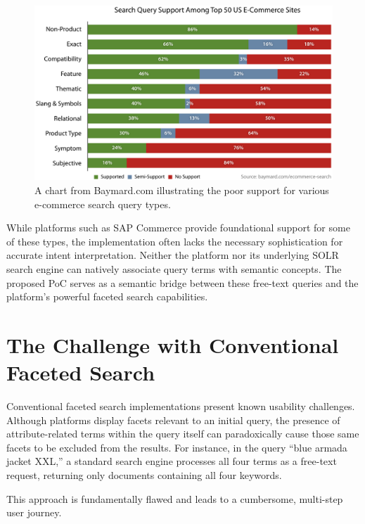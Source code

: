 \documentclass{article}
\begin{document}
    \begin{figure}[H]
        \centering
        \includegraphics[width=\columnwidth]{ecommerce-search-01-query-support-e26a0c0f33559b8702edfe2f626a3dba-1.png}
        \caption{A chart from Baymard.com illustrating the poor support for various e-commerce search query types.}
        \label{fig:baymard_chart}
    \end{figure}

    While platforms such as SAP Commerce provide foundational support for some of these types, the implementation often lacks the necessary sophistication for accurate intent interpretation. Neither the platform nor its underlying SOLR search engine can natively associate query terms with semantic concepts. The proposed PoC serves as a semantic bridge between these free-text queries and the platform's powerful faceted search capabilities.

    \section{The Challenge with Conventional Faceted Search}

    Conventional faceted search implementations present known usability challenges. Although platforms display facets relevant to an initial query, the presence of attribute-related terms within the query itself can paradoxically cause those same facets to be excluded from the results. For instance, in the query “blue armada jacket XXL,” a standard search engine processes all four terms as a free-text request, returning only documents containing all four keywords.

    This approach is fundamentally flawed and leads to a cumbersome, multi-step user journey.
\end{document}
